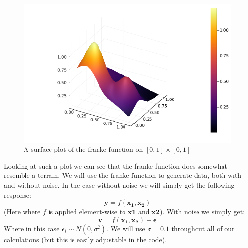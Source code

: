 \documentclass{article}
\begin{document}
\begin{figure}
    \includegraphics[scale=0.5]{frankefunction}
    \caption{A surface plot of the franke-function on $\left[ 0, 1 \right] \times \left[ 0, 1 \right]$}
    \label{franke-function-plot}
\end{figure}

Looking at such a plot we can see that the franke-function does somewhat
resemble a terrain. We will use the franke-function to generate data, both with
and without noise.  In the case without noise we will simply get the
following response:
$$\mathbf{y} = f(\mathbf{x_1}, \mathbf{x_2})$$
(Here where $f$ is applied element-wise to $\mathbf{x1}$ and $\mathbf{x2}$).
With noise we simply get:
$$\mathbf{y} = f(\mathbf{x_1}, \mathbf{x_2}) + \mathbf{\epsilon}$$
Where in this case $\epsilon_i \sim N(0, \sigma^2)$. We will use $\sigma = 0.1$
throughout all of our calculations (but this is easily adjustable in the code).
\end{document}
